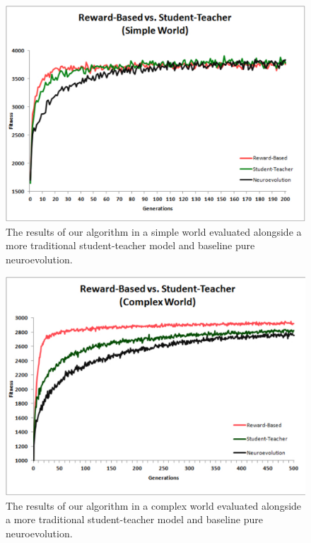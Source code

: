 \documentclass{acm_proc_article-sp}
\begin{document}
\begin{figure}
  \centering
    \includegraphics[scale=.35]{simple_reward_based_vs_student_teacher.pdf}
  \caption{The results of our algorithm in a simple world evaluated alongside a more traditional student-teacher model and baseline pure neuroevolution.}
  \label{fig:reward-studetteacher}
\end{figure}
\begin{figure}
  \centering
    \includegraphics[scale=.35]{complex_reward_based_vs_student_teacher.pdf}
  \caption{The results of our algorithm in a complex world evaluated alongside a more traditional student-teacher model and baseline pure neuroevolution.}
  \label{fig:reward-studetteacher}
\end{figure}
\end{document}
